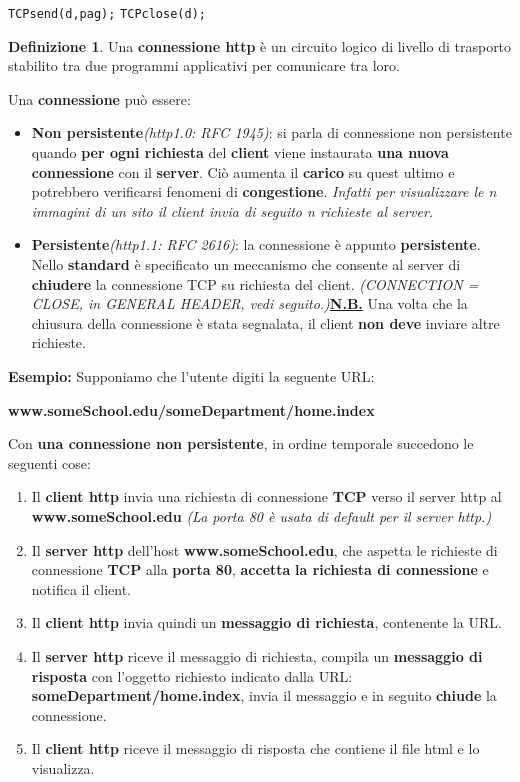 \documentclass[11pt,a4paper]{article}
\theoremstyle{definition}
\newtheorem{definition}{Definizione}[section]
\begin{document}
\texttt{TCPsend(d,pag);}\newline
\texttt{TCPclose(d);}\newline
\theoremstyle{definition}
\begin{definition}
	Una \textbf{connessione http} è  un circuito logico di livello di trasporto stabilito tra due programmi applicativi per comunicare tra loro.
\end{definition}
Una \textbf{connessione} può essere:
\begin{itemize}
	\item \textbf{Non persistente}\textit{(http1.0: RFC 1945)}: si parla di connessione non persistente quando \textbf{per ogni richiesta} del \textbf{client} viene instaurata \textbf{una nuova connessione} con il \textbf{server}. Ciò aumenta il \textbf{carico} su quest ultimo e potrebbero verificarsi fenomeni di \textbf{congestione}. \textit{Infatti per visualizzare le n immagini di un sito il client invia di seguito n richieste al server.}
	\item \textbf{Persistente}\textit{(http1.1: RFC 2616)}: la connessione è appunto \textbf{persistente}. Nello \textbf{standard} è specificato un meccanismo che consente al server di \textbf{chiudere} la connessione TCP su richiesta del client. \textit{(CONNECTION = CLOSE, in GENERAL HEADER, vedi seguito.)}\newline \textbf{\underline{N.B.}} Una volta che la chiusura della connessione è stata segnalata, il client \textbf{non deve} inviare altre richieste.
\end{itemize}
\newpage
\textbf{Esempio:}\newline
Supponiamo che l’utente digiti la seguente URL:\newline\newline \centerline{\textbf{www.someSchool.edu/someDepartment/home.index}}\newline\newline
Con \textbf{una connessione non persistente}, in ordine temporale succedono le seguenti cose:
\begin{enumerate}
	\item Il \textbf{client http}  invia una richiesta di connessione
	      \textbf{TCP} verso il server http al \textbf{www.someSchool.edu} \textit{(La porta 80 è usata di default per il server http.)}
	\item Il \textbf{server http} dell’host	\textbf{www.someSchool.edu}, che aspetta le richieste di connessione \textbf{TCP} alla \textbf{porta 80}, \textbf{accetta} \textbf{la richiesta di connessione}  e notifica il client.
	\item Il \textbf{client http} invia quindi un \textbf{messaggio di richiesta}, contenente la URL.
	\item Il \textbf{server http} riceve il messaggio di richiesta, compila un \textbf{messaggio di risposta} con l’oggetto richiesto indicato dalla URL: \textbf{someDepartment/home.index}, invia il messaggio e in seguito \textbf{chiude} la connessione.
	\item Il \textbf{client http}  riceve il messaggio di risposta che contiene il file html e lo visualizza.
\end{enumerate}
\end{document}
